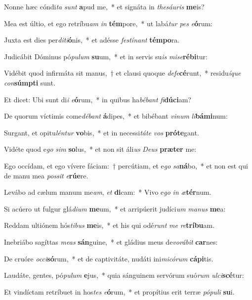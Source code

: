 \item Nonne hæc cóndi\textit{ta} \textit{sunt} \textbf{a}pud me,~* et signáta in \textit{the}\textit{sáu}\textit{ris} \textbf{me}is?
\item Mea est últio, et ego retríbu\textit{am} \textit{in} \textbf{tém}pore,~* ut labá\textit{tur} \textit{pes} \textit{e}\textbf{ó}rum:
\item Juxta est dies per\textit{di}\textit{ti}\textbf{ó}nis,~* et adésse \textit{fes}\textit{tí}\textit{nant} \textbf{tém}\textbf{po}ra.
\item Judicábit Dóminus pó\textit{pu}\textit{lum} \textbf{su}um,~* et in servis su\textit{is} \textit{mi}\textit{se}\textbf{ré}\textbf{bi}tur:
\item Vidébit quod infirmáta sit manus,~† et clausi quoque \textit{de}\textit{fe}\textbf{cé}runt,~* residu\textit{í}\textit{que} \textit{con}\textbf{súmp}\textbf{ti} sunt.
\item Et dicet: Ubi sunt di\textit{i} \textit{e}\textbf{ó}rum,~* in quibus ha\textit{bé}\textit{bant} \textit{fi}\textbf{dú}\textbf{ci}am?
\item De quorum víctimis come\textit{dé}\textit{bant} \textbf{á}dipes,~* et bibébant \textit{vi}\textit{num} \textit{li}\textbf{bá}\textbf{mi}num:
\item Surgant, et opitu\textit{lén}\textit{tur} \textbf{vo}bis,~* et in necessi\textit{tá}\textit{te} \textit{vos} \textbf{pró}\textbf{te}gant.
\item Vidéte quod e\textit{go} \textit{sim} \textbf{so}lus,~* et non sit áli\textit{us} \textit{De}\textit{us} \textbf{præ}\textbf{ter} me:
\item Ego occídam, et ego vívere fáciam:~† percútiam, et e\textit{go} \textit{sa}\textbf{ná}bo,~* et non est qui de manu mea \textit{pos}\textit{sit} \textit{e}\textbf{rú}\textbf{e}re.
\item Levábo ad cælum manum me\textit{am}, \textit{et} \textbf{di}cam:~* Vivo e\textit{go} \textit{in} \textit{æ}\textbf{tér}num.
\item Si acúero ut fulgur glá\textit{di}\textit{um} \textbf{me}um,~* et arripúerit judíci\textit{um} \textit{ma}\textit{nus} \textbf{me}a:
\item Reddam ultiónem hós\textit{ti}\textit{bus} \textbf{me}is,~* et his qui odé\textit{runt} \textit{me} \textit{re}\textbf{trí}\textbf{bu}am.
\item Inebriábo sagíttas \textit{me}\textit{as} \textbf{sán}guine,~* et gládius meus de\textit{vo}\textit{rá}\textit{bit} \textbf{car}nes:
\item De cruóre \textit{oc}\textit{ci}\textbf{só}rum,~* et de captivitáte, nudáti ini\textit{mi}\textit{có}\textit{rum} \textbf{cá}\textbf{pi}tis.
\item Laudáte, gentes, pó\textit{pu}\textit{lum} \textbf{e}jus,~* quia sánguinem servórum suó\textit{rum} \textit{ul}\textit{ci}\textbf{scé}tur:
\item Et vindíctam retríbuet in hos\textit{tes} \textit{e}\textbf{ó}rum,~* et propítius erit terræ \textit{pó}\textit{pu}\textit{li} \textbf{su}i.
